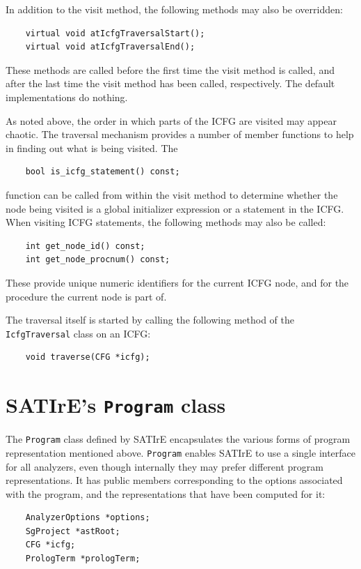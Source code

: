 \documentclass[a4paper,12pt]{report}
\begin{document}
In addition to the visit method, the following methods may also be
overridden:
\begin{verbatim}
    virtual void atIcfgTraversalStart();
    virtual void atIcfgTraversalEnd();
\end{verbatim}
These methods are called before the first time the visit method is called,
and after the last time the visit method has been called, respectively. The
default implementations do nothing.

As noted above, the order in which parts of the ICFG are visited may appear
chaotic. The traversal mechanism provides a number of member functions to
help in finding out what is being visited. The
\begin{verbatim}
    bool is_icfg_statement() const;
\end{verbatim}
function can be called from within the visit method to determine whether the
node being visited is a global initializer expression or a statement in the
ICFG. When visiting ICFG statements, the following methods may also be
called:
\begin{verbatim}
    int get_node_id() const;
    int get_node_procnum() const;
\end{verbatim}
These provide unique numeric identifiers for the current ICFG node, and for
the procedure the current node is part of.

The traversal itself is started by calling the following method of the
\texttt{IcfgTraversal} class on an ICFG:
\begin{verbatim}
    void traverse(CFG *icfg);
\end{verbatim}

%

\section{SATIrE's \texttt{Program} class}
\label{sec:satire_program}

The \texttt{Program} class defined by SATIrE encapsulates the various forms
of program representation mentioned above. \texttt{Program} enables SATIrE
to use a single interface for all analyzers, even though internally they may
prefer different program representations. It has public members
corresponding to the options associated with the program, and the
representations that have been computed for it:
\begin{verbatim}
    AnalyzerOptions *options;
    SgProject *astRoot;
    CFG *icfg;
    PrologTerm *prologTerm;
\end{verbatim}
\end{document}
